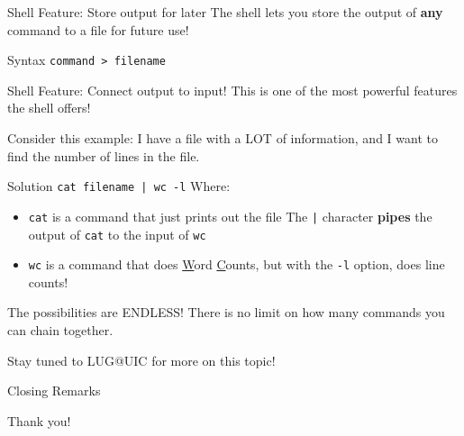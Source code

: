 \documentclass{beamer}
\begin{document}
\begin{frame}{Shell Feature: Store output for later}
	The shell lets you store the output of \textbf{any} command to a file
	for future use!

	\begin{block}{Syntax}
		\texttt{command > filename}
	\end{block}
\end{frame}

\begin{frame}{Shell Feature: Connect output to input!}
	This is one of the most powerful features the shell offers!

	Consider this example: I have a file with a LOT of information, and I
	want to find the number of lines in the file.
	
	\pause

	\begin{block}{Solution}
		\texttt{cat filename | wc -l} Where:
		\begin{itemize}
			\item \texttt{cat} is a command that just prints out
				the file The \texttt{|} character
				\textbf{pipes} the output of \texttt{cat} to
				the input of \texttt{wc}
			\item \texttt{wc} is a command that does
				\underline{W}ord \underline{C}ounts, but with
				the \texttt{-l} option, does line counts!
		\end{itemize}
	\end{block}
\end{frame}

\begin{frame}{The possibilities are ENDLESS!}
	There is no limit on how many commands you can chain together.

	Stay tuned to LUG@UIC for more on this topic!
\end{frame}

\begin{frame}{Closing Remarks}
	\begin{center}
		\Huge Thank you!
	\end{center}
\end{frame}
\end{document}

